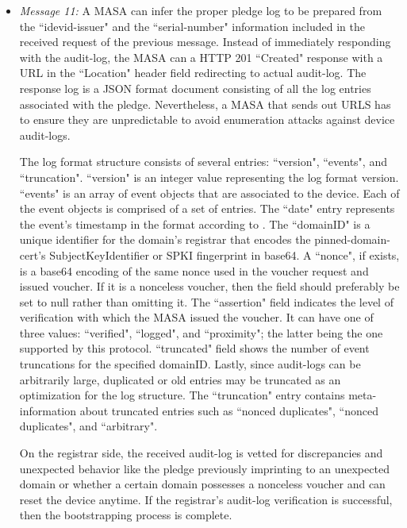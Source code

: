 \begin{itemize}
	\item \textit{Message 11:} 
	A MASA can infer the proper pledge log to be prepared from the ``idevid-issuer" and the ``serial-number" information included in the received request of the previous message. Instead of immediately responding with the audit-log, the MASA can a HTTP 201 ``Created" response with a URL in the ``Location" header field redirecting to actual audit-log. The response log is a JSON format document consisting of all the log entries associated with the pledge. Nevertheless, a MASA that sends out URLS has to ensure they are unpredictable to avoid enumeration attacks against device audit-logs.
	\par
	The log format structure consists of several entries: ``version", ``events", and ``truncation". ``version" is an integer value representing the log format version. ``events" is an array of event objects that are associated to the device. 
	Each of the event objects is comprised of a set of entries. The ``date" entry represents the event's timestamp in the format according to \cite{rfc3339}. 
	The ``domainID" is a unique identifier for the domain's registrar that encodes the pinned-domain-cert's SubjectKeyIdentifier or SPKI fingerprint in base64. A ``nonce", if exists, is a base64 encoding of the same nonce used in the voucher request and issued voucher. If it is a nonceless voucher, then the field should preferably be set to null rather than omitting it. 
	The ``assertion" field indicates the level of verification with which the MASA issued the voucher. It can have one of three values: ``verified", ``logged", and ``proximity"; the latter being the one supported by this protocol.
	``truncated" field shows the number of event truncations for the specified domainID.
	Lastly, since audit-logs can be arbitrarily large, duplicated or old entries may be truncated as an optimization for the log structure. The ``truncation" entry contains meta-information about truncated entries such as ``nonced duplicates", ``nonced duplicates", and ``arbitrary".
	\par
	On the registrar side, the received audit-log is vetted for discrepancies and unexpected behavior like the pledge previously imprinting to an unexpected domain or whether a certain domain possesses a nonceless voucher and can reset the device anytime. If the registrar's audit-log verification is successful, then the bootstrapping process is complete.
	

\end{itemize}
